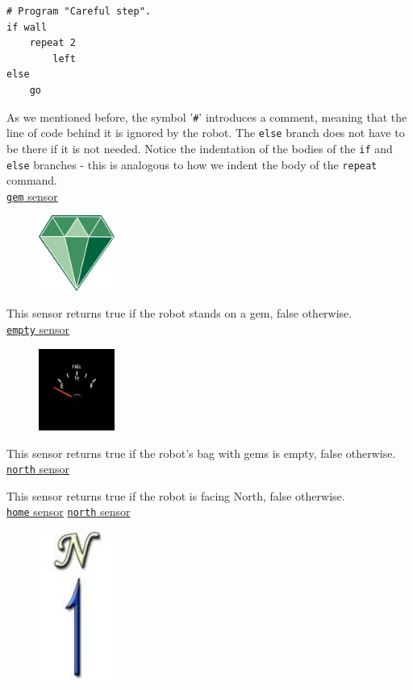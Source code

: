 \begin{verbatim}
# Program "Careful step".
if wall
    repeat 2
        left
else
    go
\end{verbatim}
As we mentioned before, the symbol '{\tt \#}' introduces a comment, meaning that the line 
of code behind it is ignored by the robot.
The {\tt else} branch does not have to be there if it is not needed. Notice the indentation 
of the bodies of the {\tt if} and {\tt else} branches - this is analogous 
to how we indent the body of the {\tt repeat} command.\\

\noindent
\underline{{\tt gem} sensor}
\begin{figure}[!ht]
\begin{center}
\includegraphics[width=2.5cm]{imgk/a29.png}
\end{center}
\end{figure}


This sensor returns true if the robot stands on a gem, false otherwise. \\

\noindent
\underline{{\tt empty} sensor}
\begin{figure}[!ht]
\begin{center}
\includegraphics[width=2.5cm]{imgk/a30.png}
\end{center}
\end{figure}


This sensor returns true if the robot's bag with gems is empty, false otherwise. \\

\noindent
\underline{{\tt north} sensor}

This sensor returns true if the robot is facing North, false otherwise.\\

\noindent
\underline{{\tt home} sensor}
\noindent
\underline{{\tt north} sensor}
\begin{figure}[!ht]
\begin{center}
\includegraphics[width=2.5cm]{imgk/a32.png}
\end{center}
\end{figure}


